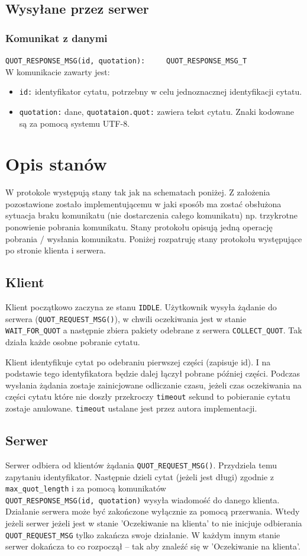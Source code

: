 \documentclass{article}
\begin{document}
\subsection{Wysyłane przez serwer}
\subsubsection{Komunikat z danymi}
\verb+QUOT_RESPONSE_MSG(id, quotation):     QUOT_RESPONSE_MSG_T+\\
W komunikacie zawarty jest:
\begin{itemize}
\item \verb+id:+ identyfikator cytatu, potrzebny w celu jednoznacznej identyfikacji cytatu.
\item \verb+quotation:+ dane, \verb+quotataion.quot:+ zawiera tekst cytatu.
Znaki kodowane są za pomocą systemu UTF-8.
\end{itemize}


\section{Opis stanów}
W protokole występują stany tak jak na schematach poniżej. 
Z założenia pozostawione zostało implementującemu w jaki sposób ma zostać
obsłużona sytuacja braku komunikatu (nie dostarczenia całego 
komunikatu) np. trzykrotne ponowienie pobrania komunikatu. 
Stany protokołu opisują jedną operację pobrania / wysłania komunikatu.
Poniżej rozpatruję stany protokołu występujące po stronie klienta i serwera.
\subsection{Klient}
Klient początkowo zaczyna ze stanu \verb+IDDLE+.
Użytkownik wysyła żądanie do serwera (\verb+QUOT_REQUEST_MSG()+), w chwili oczekiwania jest w
stanie \verb+WAIT_FOR_QUOT+ a następnie zbiera pakiety odebrane z serwera \verb+COLLECT_QUOT+.
Tak działa każde osobne pobranie cytatu.

Klient identyfikuje cytat po odebraniu pierwszej części (zapisuje id). I na podstawie tego
identyfikatora będzie dalej łączył pobrane później części.
Podczas wysłania żądania zostaje zainicjowane odliczanie czasu, jeżeli czas oczekiwania na części cytatu które nie doszły przekroczy 
\verb+timeout+ sekund to pobieranie cytatu zostaje anulowane. \verb+timeout+ ustalane jest przez autora implementacji.
\subsection{Serwer}
Serwer odbiera od klientów żądania \verb+QUOT_REQUEST_MSG()+. Przydziela temu zapytaniu identyfikator.
Następnie dzieli cytat (jeżeli jest długi) zgodnie z \verb+max_quot_length+
i za pomocą komunikatów \\ \verb+QUOT_RESPONSE_MSG(id, quotation)+ wysyła wiadomość do danego klienta.
Działanie serwera może być zakończone wyłącznie za pomocą przerwania.
Wtedy jeżeli serwer jeżeli jest w stanie 'Oczekiwanie na klienta' to nie inicjuje odbierania
\verb+QUOT_REQUEST_MSG+ tylko zakańcza swoje działanie. W każdym innym stanie serwer dokańcza to co rozpoczął --
tak aby znaleźć się w 'Oczekiwanie na klienta'.
\end{document}
